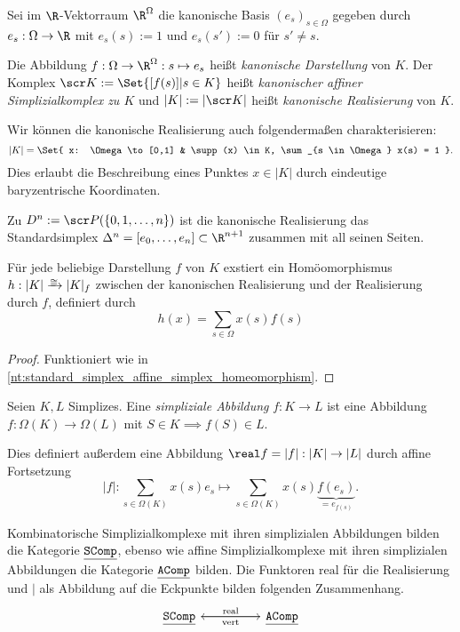 \begin{df}
	Sei im $\R$-Vektorraum $\R^\Omega$ die kanonische Basis $(e_s)_{s \in \Omega}$ gegeben durch $e_s: \Omega \to \R$ mit $e_s(s) := 1$ und $e_s(s') := 0$ für $s' \neq s$.

	Die Abbildung $f: \Omega \to \R^\Omega: s \mapsto e_s$ heißt \emph{kanonische Darstellung} von $K$.
	Der Komplex $\scr K := \Set{ [f(s)] | s \in K}$ heißt \emph{kanonischer affiner Simplizialkomplex zu $K$} und $|K| := |\scr K|$ heißt \emph{kanonische Realisierung} von $K$.
	\begin{note}
		Wir können die kanonische Realisierung auch folgendermaßen charakterisieren:
		\[
			|K| = \Set{ x: \Omega \to [0,1] & \supp(x) \in K, \sum_{s \in \Omega} x(s) = 1 }.
		\]
		Dies erlaubt die Beschreibung eines Punktes $x \in |K|$ durch eindeutige baryzentrische Koordinaten.
	\end{note}
\end{df}


\begin{ex}
	Zu $D^n := \scr P(\{0, 1, \dotsc, n\})$ ist die kanonische Realisierung das Standardsimplex $\Delta^n = [e_0, \dotsc, e_n] \subset \R^{n+1}$ zusammen mit all seinen Seiten.
\end{ex}

\begin{nt}
	Für jede beliebige Darstellung $f$ von $K$ exstiert ein Homöomorphismus $h: |K| \homto |K|_f$ zwischen der kanonischen Realisierung und der Realisierung durch $f$, definiert durch
	\[
		h(x) = \sum_{s\in \Omega} x(s) f(s)
	\]
	\begin{proof}
		Funktioniert wie in \ref{nt:standard_simplex_affine_simplex_homeomorphism}.
	\end{proof}
\end{nt}

\begin{df}
	Seien $K, L$ Simplizes.
	Eine \emph{simpliziale Abbildung} $f: K \to L$ ist eine Abbildung $f: \Omega(K) \to \Omega(L)$ mit $S \in K \implies f(S) \in L$.

	Dies definiert außerdem eine Abbildung $\real f = |f|: |K| \to |L|$ durch affine Fortsetzung
	\[
		|f|:
		\sum_{s \in \Omega(K)} x(s) e_s
		\mapsto
		\sum_{s \in \Omega(K)} x(s) \underbrace{f(e_s)}_{= e_{f(s)}}.
	\]
\end{df}

\begin{nt}
	Kombinatorische Simplizialkomplexe mit ihren simplizialen Abbildungen bilden die Kategorie $\underline{\mathtt{SComp}}$, ebenso wie affine Simplizialkomplexe mit ihren simplizialen Abbildungen die Kategorie $\underline{\mathtt{AComp}}$ bilden.
	Die Funktoren $\mathrm{real}$ für die Realisierung und $\vert$ als Abbildung auf die Eckpunkte bilden folgenden Zusammenhang.
	\[
		\begin{tikzcd}
			\Cat{SComp} \arrow{rr}{\mathrm{real}} & & \Cat{AComp} \arrow{ll}{\vert}
		\end{tikzcd}
	\]
\end{nt}


